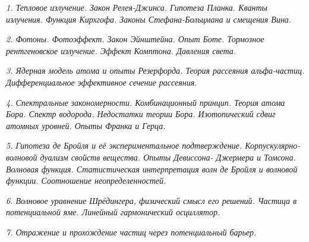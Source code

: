



\renewcommand{\div}{\mathrm{div}\,}
\newcommand{\grad}{\mathrm{grad}\,}
\newcommand{\header}[1]{\vspace*{.3em}\emph{#1}\vspace*{.2em}}
\newcommand{\D}{\,\Delta}
\newcommand{\pnder}[3]{\frac{\partial^{#1} #2}{\partial #3^{#1}}}
\renewcommand{\kappa}{\varkappa}
\newcommand{\ds}{\displaystyle}
\newcommand{\e}{\mathrm{e}}


\emph{1. Тепловое излучение. Закон Релея-Джинса. Гипотеза Планка. 
Кванты излучения. Функция Кирхгофа. Законы Стефана-Больцмана и 
смещения Вина.}

\newpage %

\emph{2. Фотоны. Фотоэффект. Закон Эйнштейна. Опыт Боте. Тормозное 
рентгеновское излучение. Эффект Комптона. Давления света.}

\newpage %

\emph{3. Ядерная модель атома и опыты Резерфорда. Теория рассеяния 
альфа-частиц. Дифференциальное эффективное сечение рассеяния.}

\newpage %

\emph{4. Спектральные закономерности. Комбинационный принцип. Теория 
атома Бора. Спектр водорода. Недостатки теории Бора. Изотопический 
сдвиг атомных уровней. Опыты Франка и Герца.}

\newpage %

\emph{5. Гипотеза де Бройля и её экспериментальное подтверждение. 
Корпускулярно-волновой дуализм свойств вещества. Опыты Девиссона-
Джермера и Томсона. Волновая функция. Статистическая интерпретация 
волн де Бройля и волновой функции. Соотношение неопределенностей.}

\newpage %

\emph{6. Волновое уравнение Шрёдингера, физический смысл его решений. 
Частица в потенциальной яме. Линейный гармонический осциллятор.}

\newpage %

\emph{7. Отражение и прохождение частиц через потенциальный барьер.}

